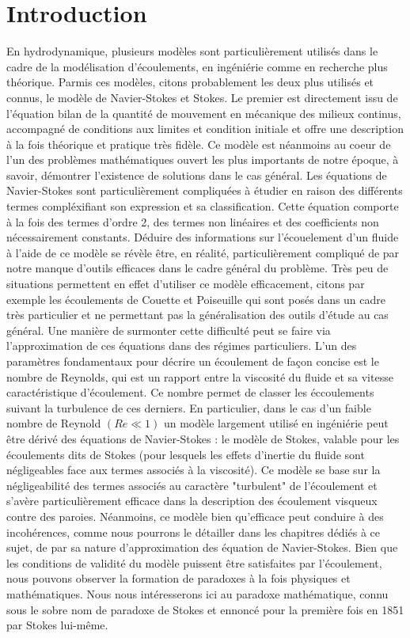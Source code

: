\chapter*{Introduction}

En hydrodynamique, plusieurs modèles sont particulièrement utilisés dans le cadre de la modélisation d'écoulements, en ingéniérie comme en recherche plus théorique. Parmis ces modèles, citons probablement les deux plus utilisés et connus, le modèle de Navier-Stokes et Stokes.
Le premier est directement issu de l'équation bilan de la quantité de mouvement en mécanique des milieux continus, accompagné de conditions aux limites et condition initiale et offre une description à la fois théorique et pratique très fidèle. Ce modèle est néanmoins au coeur 
de l'un des problèmes mathématiques ouvert les plus importants de notre époque, à savoir, démontrer l'existence de solutions dans le cas général. Les équations de Navier-Stokes sont particulièrement compliquées à étudier en raison des différents 
termes compléxifiant son expression et sa classification. Cette équation comporte à la fois des termes d'ordre 2, des termes non linéaires et des coefficients non nécessairement constants. Déduire des informations sur l'écouelement d'un fluide à l'aide de ce modèle se révèle être, en réalité,
particulièrement compliqué de par notre manque d'outils efficaces dans le cadre général du problème. Très peu de situations permettent en effet d'utiliser ce modèle efficacement, citons par exemple les écoulements de Couette et Poiseuille qui sont posés dans un cadre très particulier et ne permettant pas la généralisation
des outils d'étude au cas général. Une manière de surmonter cette difficulté peut se faire via l'approximation de ces équations dans des régimes particuliers. L'un des paramètres fondamentaux pour décrire un écoulement de façon
concise est le nombre de Reynolds, qui est un rapport entre la viscosité du fluide et sa vitesse caractéristique d'écoulement. Ce nombre permet de classer les éccoulements suivant la turbulence de ces derniers. En particulier, dans le cas d'un faible nombre de Reynold $(Re \ll 1)$ un modèle largement utilisé en ingéniérie peut être 
dérivé des équations de Navier-Stokes : le modèle de Stokes, valable pour les écoulements dits de Stokes (pour lesquels les effets d'inertie du fluide sont négligeables face aux termes associés à la viscosité). Ce modèle se base sur la négligeabilité des termes associés au caractère "turbulent" de l'écoulement et s'avère particulièrement efficace dans la description des écoulement visqueux contre des paroies.
Néanmoins, ce modèle bien qu'efficace peut conduire à des incohérences, comme nous pourrons le détailler dans les chapitres dédiés à ce sujet, de par sa nature d'approximation des équation de Navier-Stokes.
Bien que les conditions de validité du modèle puissent être satisfaites par l'écoulement, nous pouvons observer la formation de paradoxes à la fois physiques et mathématiques. Nous nous intéresserons ici au paradoxe mathématique, connu sous le sobre nom de paradoxe de Stokes et ennoncé pour la première fois en 1851 par Stokes lui-même.

